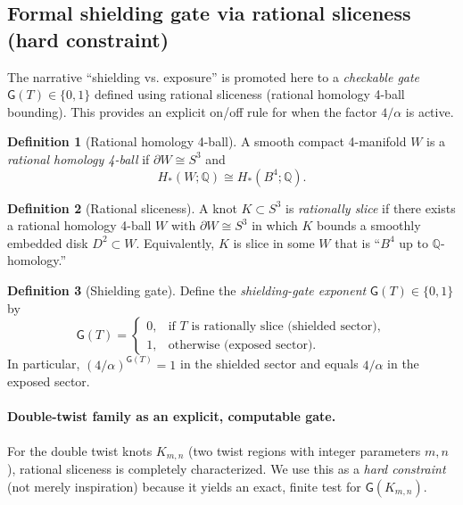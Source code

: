\documentclass[11pt]{article}
\newcommand{\Gate}{\mathsf{G}}                 %
\newcommand{\Kmn}[2]{K_{#1,#2}}                %
\theoremstyle{definition}
\newtheorem{definition}{Definition}[section]
\theoremstyle{plain}
\theoremstyle{remark}
\begin{document}
        \subsection{Formal shielding gate via rational sliceness (hard constraint)}

            The narrative ``shielding vs. exposure'' is promoted here to a \emph{checkable gate} \(\Gate(T)\in\{0,1\}\) defined using rational sliceness (rational homology 4-ball bounding). This provides an explicit on/off rule for when the factor \(4/\alpha\) is active.

            \begin{definition}[Rational homology 4-ball]
                A smooth compact 4-manifold \(W\) is a \emph{rational homology 4-ball} if \(\partial W\cong S^3\) and
                \[
                    H_\ast(W;\mathbb{Q}) \cong H_\ast(B^4;\mathbb{Q}).
                \]
            \end{definition}

            \begin{definition}[Rational sliceness]
                A knot \(K\subset S^3\) is \emph{rationally slice} if there exists a rational homology 4-ball \(W\) with \(\partial W\cong S^3\) in which \(K\) bounds a smoothly embedded disk \(D^2\subset W\).
                Equivalently, \(K\) is slice in some \(W\) that is ``\(B^4\) up to \(\mathbb{Q}\)-homology.'' \cite{Cha2007}
            \end{definition}

            \begin{definition}[Shielding gate]
                Define the \emph{shielding-gate exponent} \(\Gate(T)\in\{0,1\}\) by
                \[
                    \Gate(T)=
                    \begin{cases}
                        0, & \text{if \(T\) is rationally slice (shielded sector)},\\
                        1, & \text{otherwise (exposed sector)}.
                    \end{cases}
                \]
                In particular, \((4/\alpha)^{\Gate(T)}=1\) in the shielded sector and equals \(4/\alpha\) in the exposed sector.
            \end{definition}

            \paragraph{Double-twist family as an explicit, computable gate.}
                For the double twist knots \(\Kmn{m}{n}\) (two twist regions with integer parameters \(m,n\)), rational sliceness is completely characterized. We use this as a \emph{hard constraint} (not merely inspiration) because it yields an exact, finite test for \(\Gate(\Kmn{m}{n})\).
\end{document}
